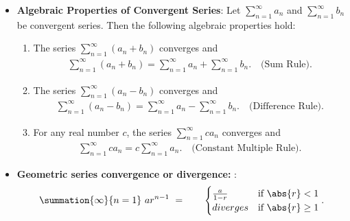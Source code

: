 \documentclass{report}
\begin{document}
\begin{itemize}
    \item \textbf{Algebraic Properties of Convergent Series}:
        Let $ \sum_{n=1}^{\infty} a_n$ and $\sum_{n=1}^{\infty} b_n$ be convergent series. Then the following algebraic properties hold:
        \begin{enumerate}
            \item The series 
                $\sum_{n=1}^{\infty} (a_n + b_n)$ converges and 
                \begin{align*}
                    \sum_{n=1}^{\infty} (a_n + b_n) = \sum_{n=1}^{\infty} a_n + \sum_{n=1}^{\infty} b_n. \quad \text{(Sum Rule)}
                .\end{align*}
            \item The series $\sum_{n=1}^{\infty} (a_n - b_n)$ converges and 
                \begin{align*}
                    \sum_{n=1}^{\infty} (a_n - b_n) = \sum_{n=1}^{\infty} a_n - \sum_{n=1}^{\infty} b_n. \quad \text{(Difference Rule)}
                .\end{align*}
            \item For any real number \( c \), the series $\sum_{n=1}^{\infty} c a_n$ converges and 
                \begin{align*}
                    \sum_{n=1}^{\infty} c a_n = c \sum_{n=1}^{\infty} a_n. \quad \text{(Constant Multiple Rule)}
                .\end{align*}
        \end{enumerate}

    \item \textbf{Geometric series convergence or divergence: }:
        \begin{align*}
            \summation{\infty}{n=1}\ ar^{n-1} \  = \quad \quad 
            \begin{cases}
                \frac{a}{1-r} & \text{if }  \abs{r} < 1\\
                diverges & \text{if }  \abs{r} \geq 1
            \end{cases}
        .\end{align*}


\end{itemize}
\end{document}
